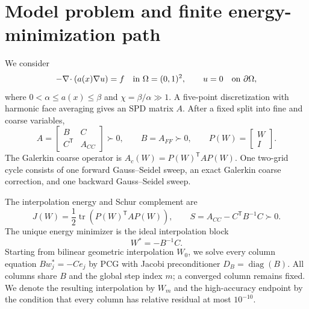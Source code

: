 \documentclass[smallextended]{svjour3}
\newcommand{\T}{\mathsf{T}}
\newcommand{\tr}{\operatorname{tr}}
\newcommand{\diag}{\operatorname{diag}}
\begin{document}
\section{Model problem and finite energy-minimization path}\label{sec:model}
We consider
\begin{equation}\label{eq:pde}
 -\nabla\!\cdot(a(x)\nabla u)=f\quad\hbox{in }\Omega=(0,1)^2,
 \qquad u=0\quad\hbox{on }\partial\Omega,
\end{equation}
where $0<\alpha\le a(x)\le\beta$ and $\chi=\beta/\alpha\gg1$. A five-point discretization with harmonic face averaging gives an SPD matrix $A$. After a fixed split into fine and coarse variables,
\begin{equation}\label{eq:blockA}
 A=\begin{bmatrix}B&C\\C^\T&A_{CC}\end{bmatrix}\succ0,
 \qquad B=A_{FF}\succ0,
 \qquad P(W)=\begin{bmatrix}W\\I\end{bmatrix}.
\end{equation}
The Galerkin coarse operator is $A_c(W)=P(W)^{\T} A P(W)$. One two-grid cycle consists of one forward Gauss--Seidel sweep, an exact Galerkin coarse correction, and one backward Gauss--Seidel sweep.

The interpolation energy and Schur complement are
\begin{equation}\label{eq:energy-schur}
 J(W)=\frac12\tr(P(W)^{\T} A P(W)),\qquad
 S=A_{CC}-C^{\T}B^{-1}C\succ0.
\end{equation}
The unique energy minimizer is the ideal interpolation block
\begin{equation}\label{eq:ideal}
 W^*=-B^{-1}C.
\end{equation}
Starting from bilinear geometric interpolation $W_0$, we solve every column equation $Bw_j^*=-Ce_j$ by PCG with Jacobi preconditioner $D_B=\diag(B)$. All columns share $B$ and the global step index $m$; a converged column remains fixed. We denote the resulting interpolation by $W_m$ and the high-accuracy endpoint by the condition that every column has relative residual at most $10^{-10}$.
\end{document}
